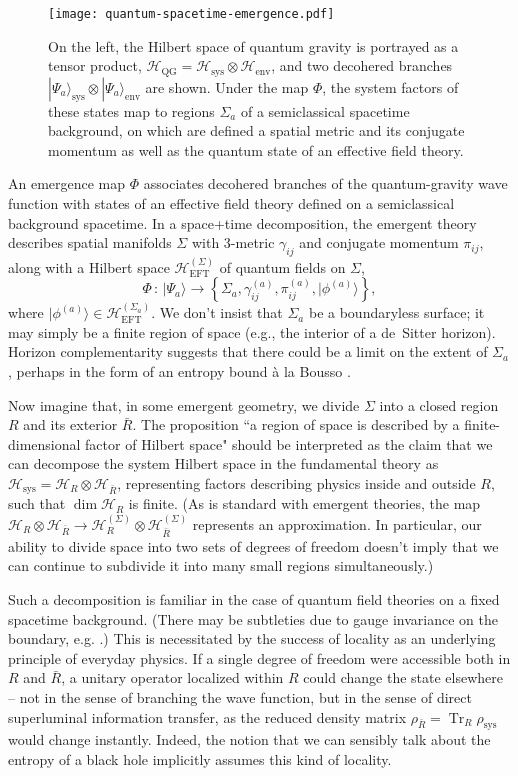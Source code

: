 \documentclass[12pt,english]{article}
\newcommand{\be}{\begin{equation}}
\newcommand{\ee}{\end{equation}}
\newcommand{\Tr}{\operatorname{Tr}}
\newcommand{\QG}{\mathrm{QG}}
\newcommand{\EFT}{\mathrm{EFT}}
\newcommand{\sys}{\mathrm{sys}}
\newcommand{\env}{\mathrm{env}}
\newcommand{\HH}{\mathcal{H}}
\begin{document}
\begin{figure}[t]
\centering
\texttt{[image: quantum-spacetime-emergence.pdf]}
\caption{On the left, the Hilbert space of quantum gravity is portrayed as a tensor product, $\HH_\QG = \HH_\sys \otimes \HH_{\env}$, and two decohered branches $|\Psi_a\rangle_{\mathrm{sys}}\otimes |\Psi_a\rangle_{\mathrm{env}}$ are shown. Under the map $\Phi$, the system factors of these states map to regions $\Sigma_a$ of a semiclassical spacetime background, on which are defined a spatial metric and its conjugate momentum as well as the quantum state of an effective field theory.}
\label{fig:qse}
\end{figure}

An emergence map $\Phi$ associates decohered branches of the quantum-gravity wave function with states of an effective field theory defined on a semiclassical background spacetime.
In a space+time decomposition, the emergent theory describes spatial manifolds $\Sigma$ with 3-metric $\gamma_{ij}$ and conjugate momentum $\pi_{ij}$, along with a Hilbert space $\HH_\EFT^{(\Sigma)}$ of quantum fields on $\Sigma$,
\be
  \Phi\, :\, |\Psi_a\rangle \rightarrow \left\{\Sigma_a, \gamma_{ij}^{(a)}, \pi_{ij}^{(a)}, |\phi^{(a)}\rangle\right\},
\ee
where $|\phi^{(a)}\rangle \in \HH_\EFT^{(\Sigma_a)}$.
We don't insist that $\Sigma_a$ be a boundaryless surface; it may simply be a finite region of space (e.g., the interior of a de~Sitter horizon).
Horizon complementarity \cite{Susskind:1993if} suggests that there could be a limit on the extent of $\Sigma_a$, perhaps in the form of an entropy bound \`a la Bousso \cite{bousso1999}.

Now imagine that, in some emergent geometry, we divide $\Sigma$ into a closed region $R$ and its exterior $\bar{R}$.
The proposition ``a region of space is described by a finite-dimensional factor of Hilbert space" should be interpreted as the claim that we can decompose the system Hilbert space in the fundamental theory as $\HH_\sys = \HH_R \otimes \HH_{\bar R}$, representing factors describing physics inside and outside $R$, such that $\dim \HH_R$ is finite.
(As is standard with emergent theories, the map $\HH_R \otimes \HH_{\bar R} \rightarrow \HH_R^{(\Sigma)} \otimes \HH_{\bar R}^{(\Sigma)}$ represents an approximation. In particular, our ability to divide space into two sets of degrees of freedom doesn't imply that we can continue to subdivide it into many small regions simultaneously.)

Such a decomposition is familiar in the case of quantum field theories on a fixed spacetime background.
(There may be subtleties due to gauge invariance on the boundary, e.g. \cite{Casini:2013rba,Harlow:2015lma}.)
This is necessitated by the success of locality as an underlying principle of everyday physics.
If a single degree of freedom were accessible both in $R$ and $\bar R$, a unitary operator localized within $R$ could change the state elsewhere -- not in the sense of branching the wave function, but in the sense of direct superluminal information transfer, as the reduced density matrix $\rho_{\bar R}=\Tr_R\rho_\sys$ would change instantly.
Indeed, the notion that we can sensibly talk about the entropy of a black hole implicitly assumes this kind of locality.
\end{document}
